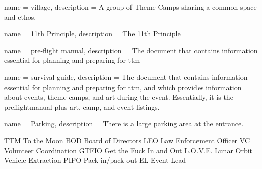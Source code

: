 {
name = {village},
description = {A group of Theme Camps sharing a common space and ethos.}
}

 {
name = {11th Principle},
description = {The 11th Principle}
}


 {
name = {pre-flight manual},
description = {The document that contains information essential for planning and preparing for \gls{ttm}}
}


 {
name = {survival guide},
description = {The document that contains information essential for planning and preparing for \gls{ttm}, and which provides information about events, theme camps, and art during the event.  Essentially, it is the \gls{preflightmanual} plus art, camp, and event listings.}
}


 {
name = {Parking},
description = {There is a large parking area at the entrance.}
}





   {TTM}      {To the Moon}
   {BOD}      {Board of Directors}
   {LEO}      {Law Enforcement Officer}
    {VC}       {Volunteer Coordination}
 {GTFIO}    {Get the Fuck In and Out}
  {L.O.V.E.} {Lunar Orbit Vehicle Extraction}
  {PIPO}     {Pack in/pack out}
    {EL}       {Event Lead}




